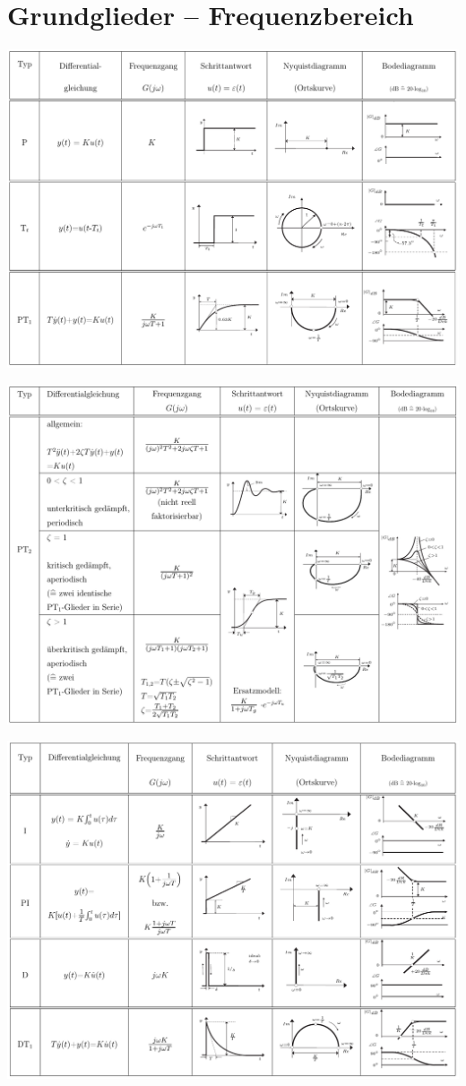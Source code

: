 \section{Grundglieder -- Frequenzbereich}

\begin{center}
    \includegraphics[width=0.9\columnwidth]{images/grundglieder/Grundglieder_Tabelle_1_small.pdf}

    \vspace{0.5cm}

    \includegraphics[width=0.9\columnwidth]{images/grundglieder/Grundglieder_Tabelle_2_small.pdf}

    \vfill\null
    \pagebreak

    \includegraphics[width=0.9\columnwidth]{images/grundglieder/Grundglieder_Tabelle_3_small.pdf}


\end{center}
